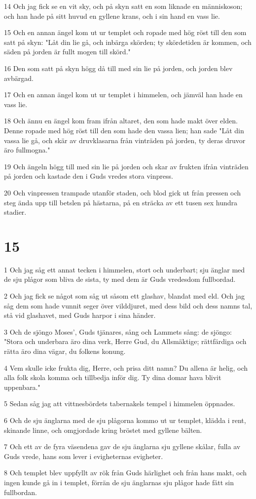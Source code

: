 \par 14 Och jag fick se en vit sky, och på skyn satt en som liknade en människoson; och han hade på sitt huvud en gyllene krans, och i sin hand en vass lie.
\par 15 Och en annan ängel kom ut ur templet och ropade med hög röst till den som satt på skyn: "Låt din lie gå, och inbärga skörden; ty skördetiden är kommen, och säden på jorden är fullt mogen till skörd."
\par 16 Den som satt på skyn högg då till med sin lie på jorden, och jorden blev avbärgad.
\par 17 Och en annan ängel kom ut ur templet i himmelen, och jämväl han hade en vass lie.
\par 18 Och ännu en ängel kom fram ifrån altaret, den som hade makt över elden. Denne ropade med hög röst till den som hade den vassa lien; han sade "Låt din vassa lie gå, och skär av druvklasarna från vinträden på jorden, ty deras druvor äro fullmogna."
\par 19 Och ängeln högg till med sin lie på jorden och skar av frukten ifrån vinträden på jorden och kastade den i Guds vredes stora vinpress.
\par 20 Och vinpressen trampade utanför staden, och blod gick ut från pressen och steg ända upp till betslen på hästarna, på en sträcka av ett tusen sex hundra stadier.

\chapter{15}

\par 1 Och jag såg ett annat tecken i himmelen, stort och underbart; sju änglar med de sju plågor som bliva de sista, ty med dem är Guds vredesdom fullbordad.
\par 2 Och jag fick se något som såg ut såsom ett glashav, blandat med eld. Och jag såg dem som hade vunnit seger över vilddjuret, med dess bild och dess namns tal, stå vid glashavet, med Guds harpor i sina händer.
\par 3 Och de sjöngo Moses', Guds tjänares, sång och Lammets sång: de sjöngo: "Stora och underbara äro dina verk, Herre Gud, du Allsmäktige; rättfärdiga och rätta äro dina vägar, du folkens konung.
\par 4 Vem skulle icke frukta dig, Herre, och prisa ditt namn? Du allena är helig, och alla folk skola komma och tillbedja inför dig. Ty dina domar hava blivit uppenbara."
\par 5 Sedan såg jag att vittnesbördets tabernakels tempel i himmelen öppnades.
\par 6 Och de sju änglarna med de sju plågorna kommo ut ur templet, klädda i rent, skinande linne, och omgjordade kring bröstet med gyllene bälten.
\par 7 Och ett av de fyra väsendena gav de sju änglarna sju gyllene skålar, fulla av Guds vrede, hans som lever i evigheternas evigheter.
\par 8 Och templet blev uppfyllt av rök från Guds härlighet och från hans makt, och ingen kunde gå in i templet, förrän de sju änglarnas sju plågor hade fått sin fullbordan.

